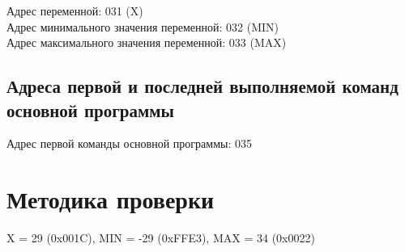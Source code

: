 \noindent Адрес переменной: 031 (X)\\
Адрес минимального значения переменной: 032 (MIN)\\
Адрес максимального значения переменной: 033 (MAX)

\subsection{Адреса первой и последней выполняемой команд основной программы}
\noindent Адрес первой команды основной программы: 035\\

\section{Методика проверки}
X = 29 (0x001C), MIN = -29 (0xFFE3), MAX = 34 (0x0022)
